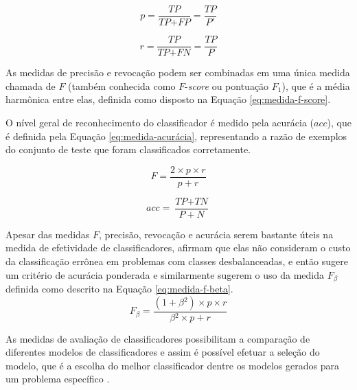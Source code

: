         \vspace{\parskip}
        \noindent\begin{minipage}{.5\textwidth}
            \begin{equation}
                \label{eq:medida-precisão}
        		p = 
        		\frac{\textit{TP}}{\textit{TP} + \textit{FP}}
        		= \frac{\textit{TP}}{P'}
            \end{equation}
        \end{minipage}
        \begin{minipage}{.5\textwidth}
            \begin{equation}
                \label{eq:medida-revocação}
        		r = 
        		\frac{\textit{TP}}{\textit{TP} + \textit{FN}}
        		= \frac{\textit{TP}}{P}
            \end{equation}
        \end{minipage}
        \vspace{\parskip}
        
        As medidas de precisão e revocação podem ser combinadas em uma única medida chamada de $F$ (também conhecida como $F$-\textit{score} ou pontuação ${F_1}$), que é a média harmônica entre elas, definida como disposto na Equação \ref{eq:medida-f-score}.

        O nível geral de reconhecimento do classificador é medido pela acurácia ($acc$), que é definida pela Equação \ref{eq:medida-acurácia}, representando a razão de exemplos do conjunto de teste que foram classificados corretamente.
        
        \vspace{\parskip}
        \noindent\begin{minipage}{.5\textwidth}
            \begin{equation}
                \label{eq:medida-f-score}
        		F = 
        		\frac{2 \times p \times r}{p + r}
            \end{equation}
        \end{minipage}
        \begin{minipage}{.5\textwidth}
            \begin{equation}
                \label{eq:medida-acurácia}
        		acc = 
        		\frac{\textit{TP} + \textit{TN}}{P + N}
            \end{equation}
        \end{minipage}
        \vspace{\parskip}
        
        Apesar das medidas $F$, precisão, revocação e acurácia serem bastante úteis na medida de efetividade de classificadores,  afirmam que elas não consideram o custo da classificação errônea em problemas com classes desbalanceadas, e então sugere um critério de acurácia ponderada e similarmente  sugerem o uso da medida $F_\beta{}$ definida como descrito na Equação \ref{eq:medida-f-beta}.        \begin{equation}
            \label{eq:medida-f-beta}
    		F_\beta{} = 
    		\frac{(1 + \beta{}^2) \times p \times r}{\beta{}^2 \times p + r}
        \end{equation}
        
        As medidas de avaliação de classificadores possibilitam a comparação de diferentes modelos de classificadores e assim é possível efetuar a seleção do modelo, que é a escolha do melhor classificador dentre os modelos gerados para um problema específico \cite[p.~364]{Han:2011:DMC:1972541}.